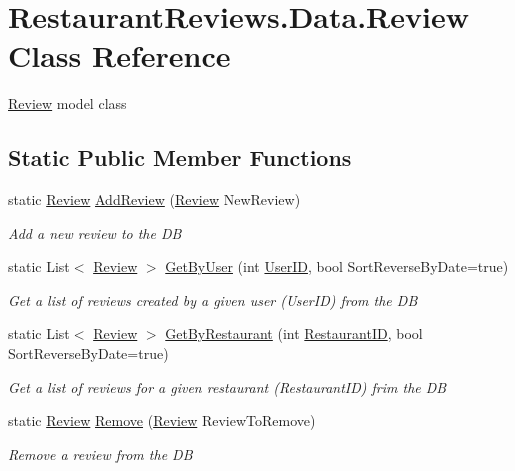 \hypertarget{class_restaurant_reviews_1_1_data_1_1_review}{}\section{Restaurant\+Reviews.\+Data.\+Review Class Reference}
\label{class_restaurant_reviews_1_1_data_1_1_review}


\hyperlink{class_restaurant_reviews_1_1_data_1_1_review}{Review} model class  


\subsection*{Static Public Member Functions}
\begin{DoxyCompactItemize}
\item 
static \hyperlink{class_restaurant_reviews_1_1_data_1_1_review}{Review} \hyperlink{class_restaurant_reviews_1_1_data_1_1_review_af34bbc94f5ace68af551950114eac88c}{Add\+Review} (\hyperlink{class_restaurant_reviews_1_1_data_1_1_review}{Review} New\+Review)
\begin{DoxyCompactList}\small\item\em Add a new review to the DB \end{DoxyCompactList}\item 
static List$<$ \hyperlink{class_restaurant_reviews_1_1_data_1_1_review}{Review} $>$ \hyperlink{class_restaurant_reviews_1_1_data_1_1_review_a564a8f2d56413888dd209e7f05a1c1c7}{Get\+By\+User} (int \hyperlink{class_restaurant_reviews_1_1_data_1_1_review_a61b089604a847d3137f398e711c8fecd}{User\+ID}, bool Sort\+Reverse\+By\+Date=true)
\begin{DoxyCompactList}\small\item\em Get a list of reviews created by a given user (User\+ID) from the DB \end{DoxyCompactList}\item 
static List$<$ \hyperlink{class_restaurant_reviews_1_1_data_1_1_review}{Review} $>$ \hyperlink{class_restaurant_reviews_1_1_data_1_1_review_a8a1b700037a79a0d532f8ff534dd5b95}{Get\+By\+Restaurant} (int \hyperlink{class_restaurant_reviews_1_1_data_1_1_review_a7684403f30d07e4fc84a235940d9d5f1}{Restaurant\+ID}, bool Sort\+Reverse\+By\+Date=true)
\begin{DoxyCompactList}\small\item\em Get a list of reviews for a given restaurant (Restaurant\+ID) frim the DB \end{DoxyCompactList}\item 
static \hyperlink{class_restaurant_reviews_1_1_data_1_1_review}{Review} \hyperlink{class_restaurant_reviews_1_1_data_1_1_review_a1554166df0dad7bdf56440417dd97f48}{Remove} (\hyperlink{class_restaurant_reviews_1_1_data_1_1_review}{Review} Review\+To\+Remove)
\begin{DoxyCompactList}\small\item\em Remove a review from the DB \end{DoxyCompactList}\end{DoxyCompactItemize}
